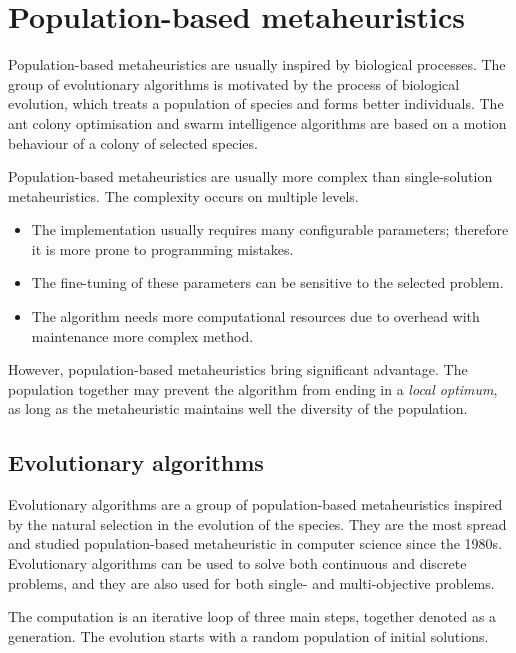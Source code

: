 \documentclass[
  print, %
  Table,   %
  nolof,     %
  nolot,     %
  11pt, %
  oneside  %
]{fithesis3}
\begin{document}
\section{Population-based metaheuristics}
\label{sec:opt-population}

Population-based metaheuristics are usually inspired by biological processes. The group of evolutionary algorithms is motivated by the process of biological evolution, which treats a population of species and forms better individuals. The ant colony optimisation and swarm intelligence algorithms are based on a motion behaviour of a colony of selected species.

Population-based metaheuristics are usually more complex than single-solu\-tion metaheuristics. The complexity occurs on multiple levels.

\begin{itemize}
    \item The implementation usually requires many configurable parameters; therefore it is more prone to programming mistakes.
    \item The fine-tuning of these parameters can be sensitive to the selected problem.
    \item The algorithm needs more computational resources due to overhead with maintenance more complex method.
\end{itemize}

However, population-based metaheuristics bring significant advantage. The population together may prevent the algorithm from ending in a \textit{local optimum}, as long as the metaheuristic maintains well the diversity of the population.

\subsection{Evolutionary algorithms}
\label{subsec:opt-popul-ea}

Evolutionary algorithms are a group of population-based metaheuristics inspired by the natural selection in the evolution of the species. They are the most spread and studied population-based metaheuristic in computer science since the 1980s. Evolutionary algorithms can be used to solve both continuous and discrete problems, and they are also used for both single- and multi-objective problems.

The computation is an iterative loop of three main steps, together denoted as a generation. The evolution starts with a random population of initial solutions.
\end{document}
